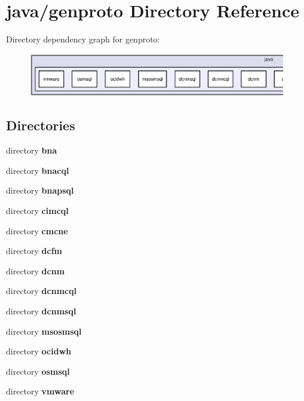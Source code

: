 \section{java/genproto Directory Reference}
\label{dir_0e43b3eaa74cb4b3a4cbe492a3c2d8cb}
Directory dependency graph for genproto\+:
\nopagebreak
\begin{figure}[H]
\begin{center}
\leavevmode
\includegraphics[width=350pt]{dir_0e43b3eaa74cb4b3a4cbe492a3c2d8cb_dep}
\end{center}
\end{figure}
\subsection*{Directories}
\begin{DoxyCompactItemize}
\item 
directory {\bf bna}
\item 
directory {\bf bnacql}
\item 
directory {\bf bnapsql}
\item 
directory {\bf cimcql}
\item 
directory {\bf cmcne}
\item 
directory {\bf dcfm}
\item 
directory {\bf dcnm}
\item 
directory {\bf dcnmcql}
\item 
directory {\bf dcnmsql}
\item 
directory {\bf msosmsql}
\item 
directory {\bf ocidwh}
\item 
directory {\bf osmsql}
\item 
directory {\bf vmware}
\end{DoxyCompactItemize}
